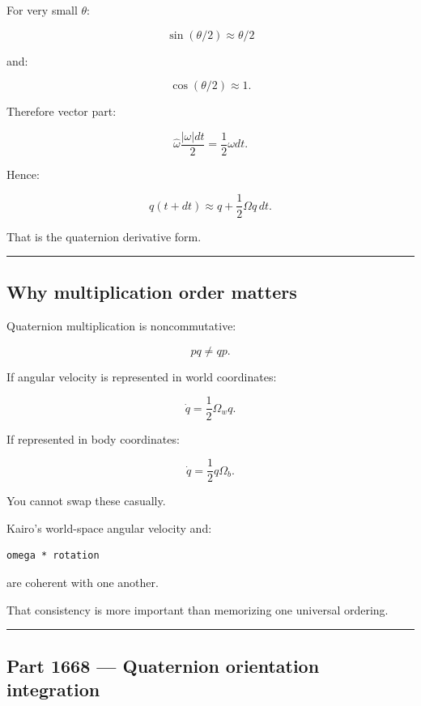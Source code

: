 For very small \(\theta\):

\[
\sin(\theta/2)
\approx
\theta/2
\]

and:

\[
\cos(\theta/2)
\approx1.
\]

Therefore vector part:

\[
\hat\omega
\frac{|\omega|dt}{2}
=
\frac12\omega dt.
\]

Hence:

\[
q(t+dt)
\approx
q+
\frac12\Omega q\,dt.
\]

That is the quaternion derivative form.

\begin{center}\rule{0.5\linewidth}{0.5pt}\end{center}

\subsection{Why multiplication order matters}\label{06-engine-ii-ch037-why-multiplication-order-matters}

\hypertarget{06-engine-ii-ch037-why-multiplication-order-matters}{}

Quaternion multiplication is noncommutative:

\[
pq\neq qp.
\]

If angular velocity is represented in world coordinates:

\[
\dot q
=
\frac12\Omega_wq.
\]

If represented in body coordinates:

\[
\dot q
=
\frac12q\Omega_b.
\]

You cannot swap these casually.

Kairo's world-space angular velocity and:

\begin{verbatim}
omega * rotation
\end{verbatim}

are coherent with one another.

That consistency is more important than memorizing one universal ordering.

\begin{center}\rule{0.5\linewidth}{0.5pt}\end{center}

\subsection{Part 1668 --- Quaternion orientation integration}\label{06-engine-ii-ch037-part-1668-quaternion-orientation-integration}

